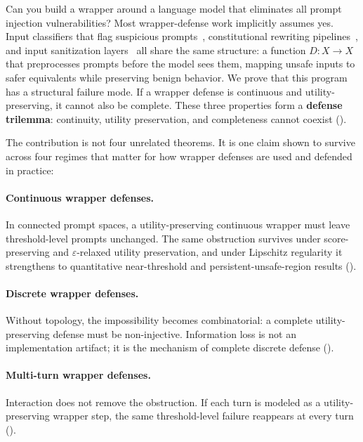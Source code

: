 \documentclass[11pt]{article}
\begin{document}
Can you build a wrapper around a language model that eliminates all
prompt injection vulnerabilities? Most wrapper-defense work implicitly
assumes yes. Input classifiers that flag suspicious
prompts~\cite{alon2023detecting}, constitutional rewriting
pipelines~\cite{bai2022constitutional}, and input sanitization
layers~\cite{inan2023llama} all share the same structure: a
function $D\colon X \to X$ that preprocesses prompts before the model
sees them, mapping unsafe inputs to safer equivalents while preserving
benign behavior. We prove that this program has a structural failure
mode. If a wrapper defense is continuous and utility-preserving, it
cannot also be complete. These three properties form a
\textbf{defense trilemma}: continuity, utility preservation, and
completeness cannot coexist ().

The contribution is not four unrelated theorems. It is one claim shown
to survive across four regimes that matter for how wrapper defenses are
used and defended in practice:

\paragraph{Continuous wrapper defenses.}
In connected prompt spaces, a utility-preserving continuous wrapper
must leave threshold-level prompts unchanged. The same obstruction
survives under score-preserving and $\varepsilon$-relaxed utility
preservation, and under Lipschitz regularity it strengthens to
quantitative near-threshold and persistent-unsafe-region results
().

\paragraph{Discrete wrapper defenses.}
Without topology, the impossibility becomes combinatorial: a complete
utility-preserving defense must be non-injective. Information loss is
not an implementation artifact; it is the mechanism of complete
discrete defense ().

\paragraph{Multi-turn wrapper defenses.}
Interaction does not remove the obstruction. If each turn is modeled as
a utility-preserving wrapper step, the same threshold-level failure
reappears at every turn ().
\end{document}
